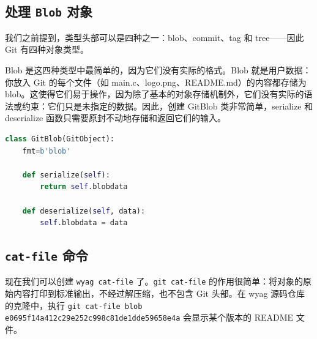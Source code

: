 \documentclass{ctexart}
\theoremstyle{remark}
\theoremstyle{warningstyle}
\theoremstyle{warningstyle}
\begin{document}
\cprotect\subsection{处理 \verb|Blob| 对象}
我们之前提到，类型头部可以是四种之一：blob、commit、tag 和 tree——因此 Git 有四种对象类型。

Blob 是这四种类型中最简单的，因为它们没有实际的格式。Blob 就是用户数据：你放入 Git 的每个文件（如 main.c、logo.png、README.md）的内容都存储为 blob。这使得它们易于操作，因为除了基本的对象存储机制外，它们没有实际的语法或约束：它们只是未指定的数据。因此，创建 GitBlob 类非常简单，serialize 和 deserialize 函数只需要原封不动地存储和返回它们的输入。
\begin{lstlisting}[language=Python]
class GitBlob(GitObject):
    fmt=b'blob'

    def serialize(self):
        return self.blobdata

    def deserialize(self, data):
        self.blobdata = data
\end{lstlisting}
\cprotect\subsection{\verb|cat-file| 命令}
现在我们可以创建 \lstinline|wyag cat-file| 了。\lstinline|git cat-file| 的作用很简单：将对象的原始内容打印到标准输出，不经过解压缩，也不包含 Git 头部。在 wyag 源码仓库的克隆中，执行 \lstinline|git cat-file blob e0695f14a412c29e252c998c81de1dde59658e4a| 会显示某个版本的 README 文件。
\end{document}
